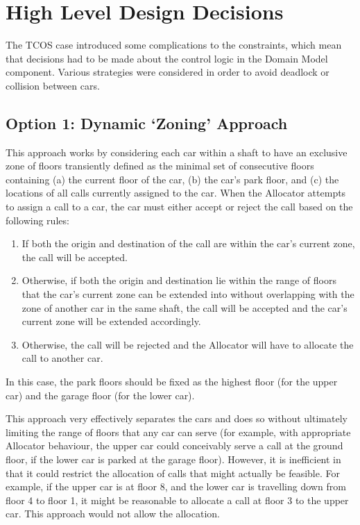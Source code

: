 \documentclass{UoYCSproject}
\begin{document}
\section{High Level Design Decisions}

The TCOS case introduced some complications to the constraints, which mean that decisions had to be made about the control logic in the Domain Model component.  Various strategies were considered in order to avoid deadlock or collision between cars.

\subsection{Option 1: Dynamic `Zoning' Approach}

This approach works by considering each car within a shaft to have an exclusive zone of floors transiently defined as the minimal set of consecutive floors containing (a) the current floor of the car, (b) the car's park floor, and (c) the locations of all calls currently assigned to the car.  When the Allocator attempts to assign a call to a car, the car must either accept or reject the call based on the following rules:
	\begin{enumerate}
		\item If both the origin and destination of the call are within the car's current zone, the call will be accepted.
		\item Otherwise, if both the origin and destination lie within the range of floors that the car's current zone can be extended into without overlapping with the zone of another car in the same shaft, the call will be accepted and the car's current zone will be extended accordingly.
		\item Otherwise, the call will be rejected and the Allocator will have to allocate the call to another car.
	\end{enumerate}

In this case, the park floors should be fixed as the highest floor (for the upper car) and the garage floor (for the lower car).

This approach very effectively separates the cars and does so without ultimately limiting the range of floors that any car can serve (for example, with appropriate Allocator behaviour, the upper car could conceivably serve a call at the ground floor, if the lower car is parked at the garage floor).  However, it is inefficient in that it could restrict the allocation of calls that might actually be feasible.  For example, if the upper car is at floor 8, and the lower car is travelling down from floor 4 to floor 1, it might be reasonable to allocate a call at floor 3 to the upper car.  This approach would not allow the allocation.
\end{document}
